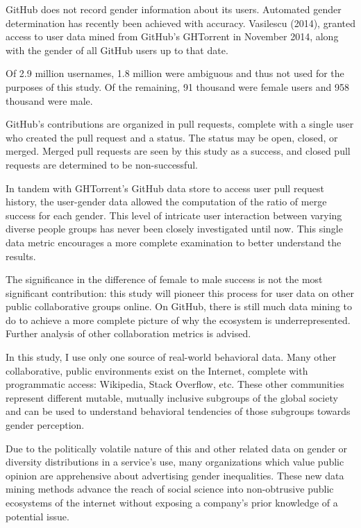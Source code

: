 \documentclass{sigplanconf}
\begin{document}
GitHub does not record gender information about its users. Automated gender
determination has recently been achieved with accuracy. \cite{VasilescuIWC13}
Vasilescu (2014), granted access to user data mined from GitHub's GHTorrent in November 2014,
along with the gender of all GitHub users up to that date.

Of 2.9 million usernames, 1.8 million were ambiguous and thus
not used for the purposes of this study. Of the remaining, 91 thousand were
female users and 958 thousand were male.

GitHub's contributions are organized in pull requests, complete with a single
user who created the pull request and a status. The status may be open, closed,
or merged. Merged pull requests are seen by this study as a success, and closed pull
requests are determined to be non-successful.

In tandem with GHTorrent's GitHub data store to
access user pull request history, the user-gender data allowed the computation of
the ratio of merge success for each gender. This level of intricate user interaction
between varying diverse people groups has never been closely investigated until
now. This single data metric encourages a more complete examination to better
understand the results.

The significance in the difference of female to male success is not the most
significant contribution: this study will pioneer this process for user data on
other public collaborative groups online.
On GitHub, there is still much data mining to do to achieve a more complete
picture of why the ecosystem is underrepresented. Further analysis of other
collaboration metrics is advised.

In this study, I use only one source of real-world behavioral data.
Many other collaborative, public environments exist on the Internet, complete
with programmatic access: Wikipedia, Stack Overflow, etc. These other
communities represent different mutable, mutually inclusive subgroups of the global
society and can be used to understand behavioral tendencies of those subgroups
towards gender perception.

Due to the politically volatile nature of this and other related data on gender
or diversity distributions in a service's use, many organizations which value
public opinion are apprehensive about advertising gender inequalities. These new data
mining methods advance the reach of social science into non-obtrusive public
ecosystems of the internet without exposing a company's prior knowledge of a
potential issue.
\end{document}
